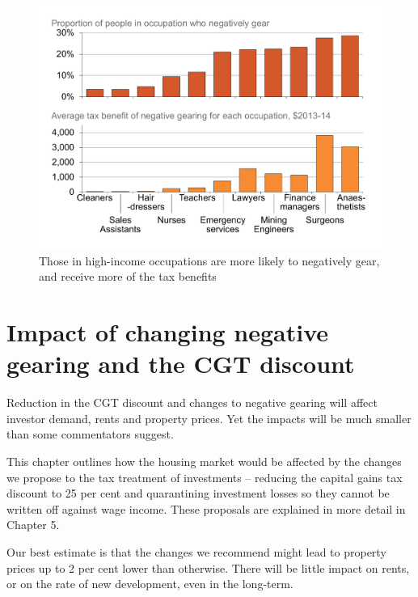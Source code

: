 \begin{figure}
\captionsetup{justification=raggedright, singlelinecheck=false}
\caption{Those in high-income occupations are more likely to negatively gear, and receive more of the tax benefits}\label{fig:NG-by-occup}
\includegraphics[width=\columnwidth]{CGT-NG-atlas/Occupation-pptx.pdf}

\end{figure}

\chapter{Impact of changing negative gearing and the CGT discount}\label{chapter:Impacts}
Reduction in the CGT discount and changes to negative gearing will affect investor demand, rents and property prices. Yet the impacts will be much smaller than some commentators suggest. 

This chapter outlines how the housing market would be affected by the changes we propose to the tax treatment of investments – reducing the capital gains tax discount to 25 per cent and quarantining investment losses so they cannot be written off against wage income. 
These proposals are explained in more detail in Chapter 5. 

Our best estimate is that the changes we recommend might lead to property prices up to 2 per cent lower than otherwise. There will be little impact on rents, or on the rate of new development, even in the long-term.


